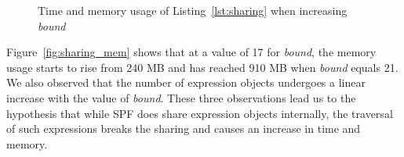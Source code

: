 \begin{figure}%
    \centering
    \qquad
    \caption{Time and memory usage of Listing~\ref{lst:sharing} when increasing \textit{bound}}%
    \label{fig:sharing}%
\end{figure}
%
Figure~\ref{fig:sharing_mem} shows that at a value of 17 for \textit{bound}, the memory usage starts to rise from 240 MB and has reached 910 MB when \textit{bound} equals 21.
%
We also observed that the number of expression objects undergoes a linear increase with the value of \textit{bound}.
%
These three observations lead us to the hypothesis that while SPF does
share expression objects internally, the traversal of such
expressions breaks the sharing and causes an increase in time and memory.
%
%
%
